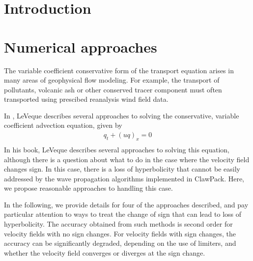 \documentclass{article}
\begin{document}
\section{Introduction}
\section{Numerical approaches}
The variable coefficient conservative form of the transport equation arises in many areas of
geophysical flow modeling.  For example, the transport of pollutants, volcanic ash or 
other conserved tracer component must often transported using prescibed reanalysis 
wind field data. 

In \cite{le:2002}, LeVeque describes several approaches to solving the conservative, 
variable coefficient advection equation, given by
\begin{align}
q_t + (uq)_x = 0 \\
\end{align}
In his book, LeVeque describes several approaches to solving this equation, although
there is a question about what to do in the case where the velocity field changes sign. 
In this case, there is a loss of hyperbolicity that cannot be easily addressed by the 
wave propagation algorithms implemented in ClawPack.  Here, we propose reasonable approaches
to handling this case. 

In the following, we provide details for four of the approaches described, and pay
particular attention to ways to treat the change of sign that can lead to loss of 
hyperbolicity.  The accuracy obtained from such methods is second order for velocity
fields with no sign changes.  For velocity fields with sign changes, the accuracy can be
significantly degraded, depending on the use of limiters, and whether the velocity field 
converges or diverges at the sign change.  
\end{document}
